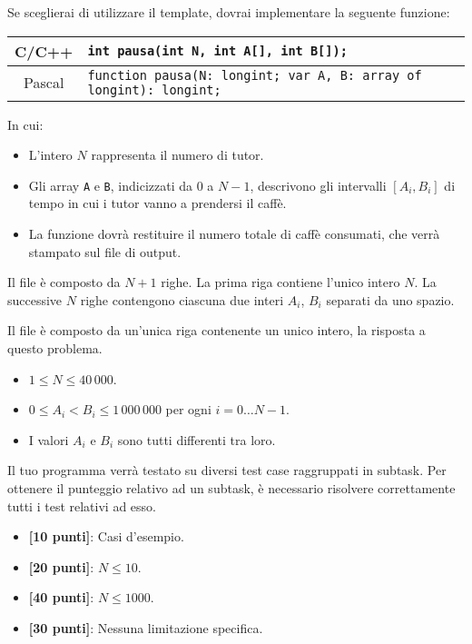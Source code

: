 Se sceglierai di utilizzare il template, dovrai implementare la seguente funzione:
\begin{center}\begin{tabularx}{\textwidth}{|c|X|}
\hline
C/C++  & \verb|int pausa(int N, int A[], int B[]);|\\
\hline
Pascal & \verb|function pausa(N: longint; var A, B: array of longint): longint;|\\
\hline
\end{tabularx}\end{center}
In cui:
\begin{itemize}[nolistsep]
  \item L'intero $N$ rappresenta il numero di tutor.
  \item Gli array \texttt{A} e \texttt{B}, indicizzati da $0$ a $N-1$, descrivono gli intervalli $[A_i, B_i]$ di tempo in cui i tutor vanno a prendersi il caff\`e.
  \item La funzione dovrà restituire il numero totale di caff\`e consumati, che verrà stampato sul file di output.
\end{itemize}

\InputFile
Il file  è composto da $N+1$ righe. La prima riga contiene l'unico intero $N$. La successive $N$ righe contengono ciascuna due interi $A_i$, $B_i$ separati da uno spazio.

\OutputFile
Il file \outputfile{} è composto da un'unica riga contenente un unico intero, la risposta a questo problema.

\pagebreak
\Constraints
\begin{itemize}[nolistsep, itemsep=2mm]
	\item $1 \le N \le 40\,000$.
	\item $0 \le A_i < B_i \le 1\,000\,000$ per ogni $i=0\ldots N-1$.
	\item I valori $A_i$ e $B_i$ sono tutti differenti tra loro.
\end{itemize}

\Scoring
Il tuo programma verrà testato su diversi test case raggruppati in subtask.
Per ottenere il punteggio relativo ad un subtask, è necessario risolvere
correttamente tutti i test relativi ad esso.

\begin{itemize}[nolistsep,itemsep=2mm]
  \item \textbf{ [10 punti]}: Casi d'esempio.
  \item \textbf{ [20 punti]}: $N \leq 10$.
  \item \textbf{ [40 punti]}: $N \leq 1000$.
  \item \textbf{ [30 punti]}: Nessuna limitazione specifica.
\end{itemize}

